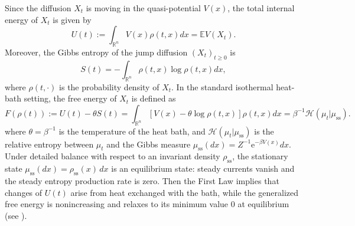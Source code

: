 \documentclass[10pt]{article}
\theoremstyle{definition}
\numberwithin{equation}{section}
\begin{document}
Since the diffusion $X_t$ is moving in the quasi-potential $V(x)$, the total internal energy of $X_t$ is given by
\begin{equation*}
    U(t):= \int_{\mathbb{R}^n} V(x) \rho(t,x) dx = \mathbb{E}V(X_t).
\end{equation*}
Moreover, the Gibbs entropy of the jump diffusion $(X_t)_{t \geq 0}$ is 
\begin{equation*}
    S(t) = -\int_{\mathbb{R}^n}\rho(t,x)\log \rho(t,x) dx,
\end{equation*}
where $\rho(t,\cdot)$ is the probability density of $X_t$.
In the standard isothermal heat-bath setting, the free energy of $X_t$ is defined as 
\begin{equation}\label{freeener:DB}
    F(\rho(t)) := U(t) - \theta S(t) = \int_{\mathbb{R}^n} [V(x) - \theta \log \rho(t,x)]\rho(t,x) dx = \beta^{-1}\mathcal{H}(\mu_{t} | \mu_\mathrm{ss}) .
\end{equation}
where $\theta = \beta^{-1}$ is the temperature of the heat bath, and $\mathcal{H}(\mu_{t} | \mu_\mathrm{ss})$ is the relative entropy between $\mu_{t}$ and the Gibbs measure $\mu_\mathrm{ss}(dx) =  Z^{-1} \mathrm{e}^{-\beta V(x)}dx$.
Under detailed balance with respect to an invariant density $\rho_{\mathrm{ss}}$, the stationary state $\mu_{\mathrm{ss}}(dx)=\rho_{\mathrm{ss}}(x)\,dx$ is an equilibrium state: steady currents vanish and the steady entropy production rate is zero. Then the First Law implies that changes of $U(t)$ arise from heat exchanged with the bath, while the generalized free energy is nonincreasing and relaxes to its minimum value $0$ at equilibrium (see \cite{ZL25}).
\end{document}
